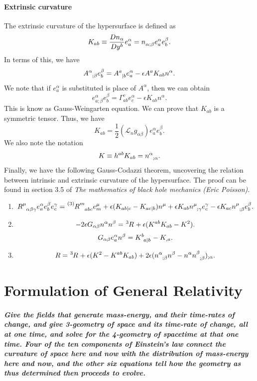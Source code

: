 \subsubsection{Extrinsic curvature}
The extrinsic curvature of the hypersurface is defined as
\[K_{ab} \equiv \frac{Dn_{\alpha}}{Dy^b}e_a^{\alpha} = \tensor{n}{_{\alpha;\beta}} e_a^{\alpha} e_b^{\beta}.\]
In terms of this, we have
\[\tensor{A}{^{\alpha}_{;\beta}} e_b^{\beta} = \tensor{A}{^a_{|b}} e_a^{\alpha} - \epsilon A^a K_{ab}n^{\alpha}.\]
We note that if $e_a^{\alpha}$ is substituted is place of $A^{\alpha}$, then we can obtain
\[e^{\alpha}_{a;\beta} e_b^{\beta} = \Gamma^c_{ab}e_c^{\alpha} - \epsilon K_{ab}n^{\alpha}.\]
This is know as Gauss-Weingarten equation. We can prove that $K_{ab}$ is a symmetric tensor. Thus, we have
\[K_{ab} = \frac{1}{2}(\mathscr{L}_n g_{\alpha \beta})e_a^{\alpha} e_b^{\beta}.\]
We also note the notation
\[K \equiv h^{ab}K_{ab} = \tensor{n}{^{\alpha}_{;\alpha}}.\]
Finally, we have the following Gauss-Codazzi theorem, uncovering the relation between intrinsic and extrinsic curvature of the hypersurface. The proof can be found in section 3.5 of \emph{The mathematics of black hole mechanics (Eric Poisson)}.


\begin{newthem}
\begin{enumerate}
\item \[\tensor{R}{^{\mu}_{\alpha \beta \gamma}} e_a^{\alpha} e_b^{\beta} e_c^{\gamma} 
= \tensor[^{(3)}]{R}{^m_{abc}} e_m^{\mu} + \epsilon (K_{ab|c} - K_{ac|b})n^{\mu} + \epsilon K_{ab} \tensor{n}{^{\mu}_{;\gamma}} e_c^{\gamma} - \epsilon K_{ac} \tensor{n}{^{\mu}_{;\beta}} e_b^{\beta}.\]
\item \[-2\epsilon G_{\alpha \beta} n^{\alpha} n^{\beta} = \tensor[^3]{R}{} + \epsilon(K^{ab}K_{ab}-K^2).\]
\[G_{\alpha \beta} e_a^{\alpha}n^{\beta} = \tensor{K}{^b_{a|b}} - K_{,a}.\]
\item \[R = \tensor[^3]{R}{} + \epsilon(K^2-K^{ab}K_{ab}) + 2\epsilon(\tensor{n}{^{\alpha}_{;\beta}} n^{\beta}-n^{\alpha} \tensor{n}{^{\beta}_{;\beta}})_{;\alpha}.\]
\end{enumerate}
\end{newthem}

\chapter{Formulation of General Relativity}
\paragraph*{Give the fields that generate mass-energy, and their time-rates of change, and give 3-geometry of space and its time-rate of change, all at one time, and solve for the 4-geometry of spacetime at that one time. Four of the ten components of Einstein's law connect the curvature of space here and now with the distribution of mass-energy here and now, and the other six equations tell how the geometry as thus determined then proceeds to evolve.}

